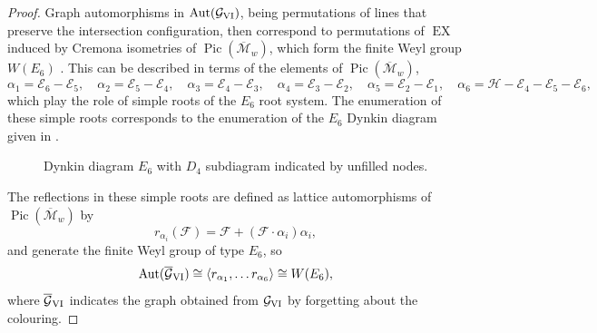 \documentclass[a4paper,reqno]{amsart}
\numberwithin{equation}{section}
\newcommand{\E}{\mathcal{E}}
\newcommand{\F}{\mathcal{F}}
\newcommand{\h}{\mathcal{H}}
\newcommand{\Pic}{\operatorname{Pic}}
\numberwithin{equation}{section}
\begin{document}
\begin{proof}
    Graph automorphisms in $\operatorname{Aut}(\mathcal{G}_{\rm{VI}})$, being permutations of lines that preserve the intersection configuration, then correspond to permutations of $\operatorname{EX}$ induced by Cremona isometries of $\Pic(\overline{\mathcal{M}}_w)$, which form the finite Weyl group $W(E_6)$ \cite{dolgachevclassicalAG}.
    This can be described in terms of the elements of $\Pic(\overline{\mathcal{M}}_w)$,
    $$\alpha_1 = \E_6-\E_5, \quad \alpha_2=\E_5-\E_4, \quad \alpha_3=\E_4-\E_3, \quad \alpha_4=\E_3-\E_2, \quad \alpha_5=\E_2-\E_1, \quad \alpha_6 = \h -\E_4-\E_5-\E_6,$$
    which play the role of simple roots of the $E_6$ root system.
    The enumeration of these simple roots corresponds to the enumeration of the $E_6$ Dynkin diagram given in .
\begin{figure}[htb]
    \centering
   \caption{Dynkin diagram $E_6$ with $D_4$ subdiagram indicated by unfilled nodes.}
    \label{fig:dynkinE6}
\end{figure}
    The reflections in these simple roots are defined as lattice automorphisms of $\Pic(\overline{\mathcal{M}}_w)$ by 
    \begin{equation} \label{eq:reflectionformulapic}
        r_{\alpha_i} (\F) = \F + (\F\cdot \alpha_i)\alpha_i,
    \end{equation}
    and generate the finite Weyl group of type $E_6$, so 
    \begin{equation*}
        \operatorname{Aut}(\overline{\mathcal{G}}_{\rm{VI}}) \cong \langle r_{\alpha_1},\dots r_{\alpha_6}\rangle \cong W(E_6),
    \end{equation*}
    where $\overline{\mathcal{G}}_{\rm{VI}}$ indicates the graph obtained from $\mathcal{G}_{\rm{VI}}$ by forgetting about the colouring.
    

\end{proof}
\end{document}
